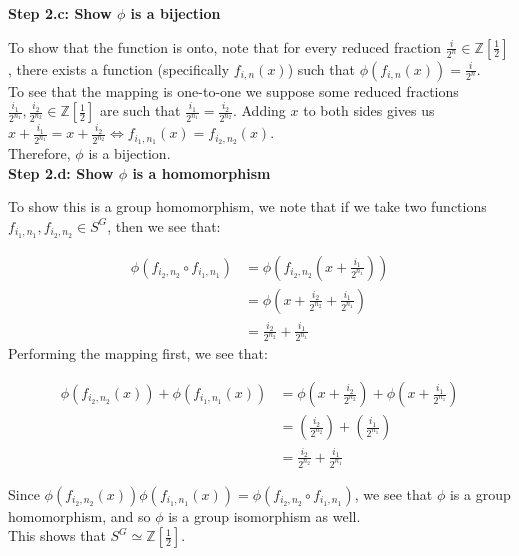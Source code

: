 \documentclass[12pt]{article}%
\newcommand{\Z}{\mathbb{Z}}
\begin{document}
\textbf{Step 2.c: Show $\phi$ is a bijection}

To show that the function is onto, note that for every reduced fraction
$\frac{i}{2^n} \in \Z[\frac{1}{2}]$, there exists a function (specifically $f_{i,n}(x)$) such that
$\phi(f_{i,n}(x))=\frac{i}{2^n}$. \\

To see that the mapping is one-to-one we suppose some reduced fractions
$\frac{i_{1}}{2^{n_1}}, \frac{i_{2}}{2^{n_2}} \in \Z[\frac{1}{2}]$ are such that
$\frac{i_{1}}{2^{n_1}} = \frac{i_{2}}{2^{n_2}}$. Adding $x$ to both sides gives us 
$x+\frac{i_{1}}{2^{n_{1}}}=x+\frac{i_{2}}{2^{n_{2}}}\Leftrightarrow f_{i_{1},n_{1}}(x)=f_{i_{2},n_{2}}(x)$. \\

Therefore, $\phi$ is a bijection. \\

\textbf{Step 2.d: Show $\phi$ is a homomorphism}

To show this is a group homomorphism, we note that if we take two functions
$f_{i_{1},n_{1}}, f_{i_{2},n_{2}} \in S^G$, then we see that:

\begin{align*}
\phi\left(f_{i_{2},n_{2}} \circ f_{i_{1},n_{1}}\right)
&=\phi \left(f_{i_{2},n_{2}}\left(x+\frac{i_{1}}{2^{n_1}}\right)\right) \\
&=\phi\left(x+\frac{i_{2}}{2^{n_2}}+\frac{i_{1}}{2^{n_1}}\right) \\
&=\frac{i_{2}}{2^{n_2}}+\frac{i_{1}}{2^{n_1}}
\end{align*}
Performing the mapping first, we see that:

\begin{align*}
\phi\left(f_{i_{2},n_{2}}(x)\right)+\phi\left(f_{i_{1},n_{1}}(x)\right)
&=\phi \left(x+\frac{i_{2}}{2^{n_2}}\right)+\phi \left(x+\frac{i_{1}}{2^{n_1}}\right) \\
&=\left(\frac{i_{2}}{2^{n_2}}\right) + \left(\frac{i_{1}}{2^{n_1}}\right) \\
&=\frac{i_{2}}{2^{n_2}}+\frac{i_{1}}{2^{n_1}}
\end{align*}

Since $\phi\left(f_{i_{2},n_{2}}(x)\right)\phi\left(f_{i_{1},n_{1}}(x)\right)=\phi\left(f_{i_{2},n_{2}} \circ f_{i_{1},n_{1}}\right)$,
we see that $\phi$ is a group homomorphism, and so $\phi$ is a group isomorphism as well. \\

This shows that $S^G\simeq \Z\left[\frac{1}{2}\right]$.
\end{document}

